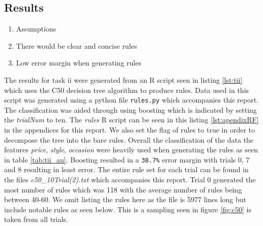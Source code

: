 \documentclass[letterpaper,10pt]{article}
\begin{document}
\subsection*{Results}
\begin{enumerate}
\item[] Assumptions 
\item There would be clear and concise rules 
\item Low error margin when generating rules
\end{enumerate} 
The results for task ii were generated from an R script seen in listing \hyperref[lst:tii]{\ref{lst:tii}} which uses the C50 decision tree algorithm to produce rules. Data used in this script was generated using a python file \verb+rules.py+ which accompanies this report. The classification was aided through using boosting which is indicated by setting the \textit{trialNum} to ten. The \textit{rules} R script can be seen in this listing \hyperref[lst:apendixRF]{\ref{lst:apendixRF}} in the appendices for this report. We also set the flag of rules to true in order to decompose the tree into the bare rules. \newline\newline
Overall the classification of the data the features \textit{price}, \textit{style}, \textit{occasion} were heavily used when generating the rules as seen in table \hyperref[tab:tii_au]{\ref{tab:tii_au}}. Boosting resulted in a \verb+38.7%+ error margin with trials 0, 7 and 8 resulting in least error. The entire rule set for each trial can be found in the files \textit{c50\_10Trial(2).txt} which accompanies this report.
Trial 0 generated the most number of rules which was 118 with the average number of rules being between 40-60. We omit listing the rules here as the file is 5977 lines long but include notable rules as seen below. This is a sampling seen in figure \hyperref[fig:c50]{\ref{fig:c50}} is taken from all trials.
\end{document}
